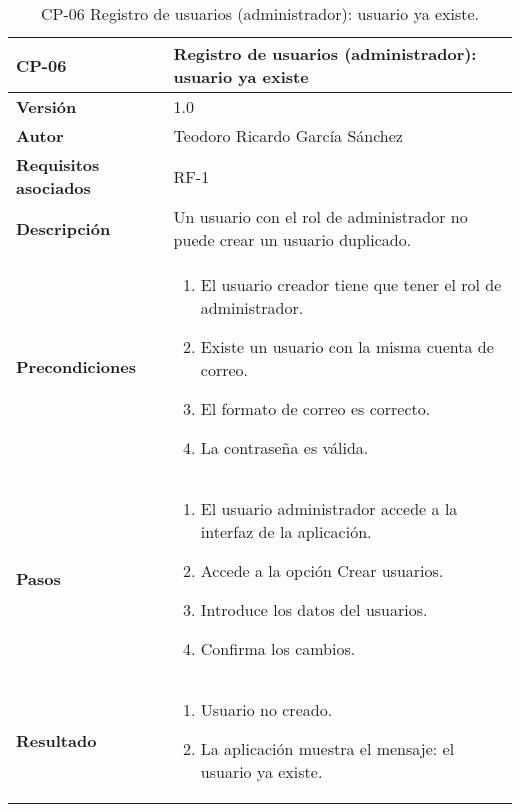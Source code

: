 \begin{table}[p]
	\centering
	\begin{tabularx}{\linewidth}{ p{} p{} }
		\toprule
		\textbf{CP-06}    & \textbf{Registro de usuarios (administrador): usuario ya existe}\\
		\toprule
		\textbf{Versión}              & 1.0    \\
		\textbf{Autor}                & Teodoro Ricardo García Sánchez \\
		\textbf{Requisitos asociados} & RF-1 \\
		\textbf{Descripción}          & Un usuario con el rol de administrador no puede crear un usuario duplicado. \\
		\textbf{Precondiciones}         & 
		\begin{enumerate}
			\def\labelenumi{\arabic{enumi}.}
			\tightlist
			\item El usuario creador tiene que tener el rol de administrador.
			\item Existe un usuario con la misma cuenta de correo.
			\item El formato de correo es correcto.
			\item La contraseña es válida.
		\end{enumerate}\\
		\textbf{Pasos}             &
		\begin{enumerate}
			\def\labelenumi{\arabic{enumi}.}
			\tightlist
			\item El usuario administrador accede a la interfaz de la aplicación.
			\item Accede a la opción Crear usuarios.
			\item Introduce los datos del usuarios.
			\item Confirma los cambios.
		\end{enumerate}\\
		\textbf{Resultado}          & 
		\begin{enumerate}
			\item Usuario no creado.
			\item La aplicación muestra el mensaje: el usuario ya existe.
		\end{enumerate}\\
		\bottomrule
	\end{tabularx}
	\caption{CP-06 Registro de usuarios (administrador): usuario ya existe.}
\end{table}


